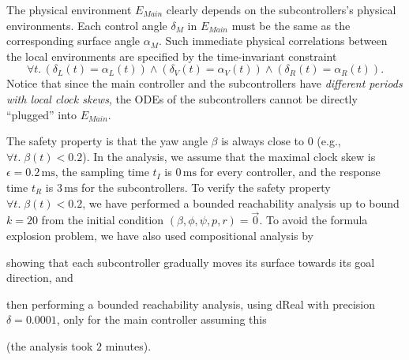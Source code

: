 The physical environment $E_\mathit{Main}$ clearly depends on the subcontrollers's physical environments.
Each control angle $\delta_M$ in  $E_\mathit{Main}$ must be the same as the corresponding surface angle $\alpha_M$.
%
Such  immediate physical correlations between the local %
environments are specified by the time-invariant constraint
%
\[\forall t.\, (\delta_L(t) = \alpha_L(t)) \wedge (\delta_V(t) = \alpha_V(t)) \wedge (\delta_R(t) = \alpha_R(t)).
\]
Notice that since the main controller and the subcontrollers have \emph{different periods with local clock skews},
the ODEs of the subcontrollers cannot be directly ``plugged'' into $E_\mathit{Main}$.

The safety property %
is that the yaw angle $\beta$ is always close to $0$ (e.g., $\forall t.\; \beta(t) < 0.2$).
%
In the analysis,
we assume that the maximal clock skew is $\epsilon = 0.2\,\mathrm{ms}$,
the sampling time $t_I$ is $0\,\mathrm{ms}$ for every controller,
and the response time $t_R$ is $3\,\mathrm{ms}$ for the subcontrollers.
%
To verify the safety property $\forall t.\; \beta(t) < 0.2$,
we have performed a bounded reachability analysis 
up to bound $k = 20$ from the initial condition 
$(\beta, \phi, \psi, p, r) = \vec{0}$. %
%
To avoid the formula explosion problem, 
we have also used compositional analysis by 
\begin{inparaenum}[(i)]
	\item showing that each subcontroller gradually moves its surface towards its goal direction, and 
	\item then performing a bounded reachability analysis,
	using \textsf{dReal} with precision $\delta = 0.0001$,
	 only for the main controller assuming this
\end{inparaenum}
(the analysis took $2$ minutes).





